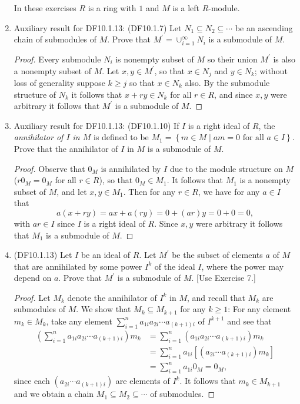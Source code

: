 \documentclass[11pt]{article}
\newcommand{\br}[1]{\left(#1\right)}
\newcommand{\cbr}[1]{\left\{#1\right\}}
\begin{document}
\begin{enumerate}
    In these exercises $R$ is a ring with $1$ and $M$ is a left $R$-module.
    \item Auxiliary result for DF10.1.13: (DF10.1.7) Let $N_1\subseteq N_2\subseteq \cdots$ be an ascending chain of submodules of $M$. Prove that $M^{\prime} = \cup_{i=1}^\infty N_i$ is a submodule of $M$. \begin{proof}
      Every submodule $N_i$ is nonempty subset of $M$ so their union $M^{\prime}$ is also a nonempty subset of $M$. Let $x,y\in M^{\prime}$, so that $x\in N_j$ and $y\in N_k$; without loss of generality suppose $k\geq j$ so that $x\in N_k$ also. By the submodule structure of $N_k$ it follows that $x+ry\in N_k$ for all $r\in R$, and since $x,y$ were arbitrary it follows that $M^{\prime}$ is a submodule of $M$.
    \end{proof}
    \item Auxiliary result for DF10.1.13: (DF10.1.10) If $I$ is a right ideal of $R$, the \textit{annihilator of $I$ in $M$} is defined to be $M_1 = \cbr{m\in M\mid am = 0 \text{ for all } a\in I}$. Prove that the annihilator of $I$ in $M$ is a submodule of $M$. \begin{proof}
      Observe that $0_M$ is annihilated by $I$ due to the module structure on $M$ ($r0_M = 0_M$ for all $r\in R$), so that $0_M\in M_1$. It follows that $M_1$ is a nonempty subset of $M$, and let $x,y\in M_1$. Then for any $r\in R$, we have for any $a\in I$ that \[a(x+ry) = ax + a(ry) = 0 + (ar)y = 0+ 0 = 0,\] with $ar\in I$ since $I$ is a right ideal of $R$. Since $x,y$ were arbitrary it follows that $M_1$ is a submodule of $M$.
    \end{proof}
    \item (DF10.1.13) Let $I$ be an ideal of $R$. Let $M^{\prime}$ be the subset of elements $a$ of $M$ that are annihilated by some power $I^k$ of the ideal $I$, where the power may depend on $a$. Prove that $M^{\prime}$ is a submodule of $M$. [Use Exercise 7.] \begin{proof}
      Let $M_k$ denote the annihilator of $I^k$ in $M$, and recall that $M_k$ are submodules of $M$. We show that $M_k\subseteq M_{k+1}$ for any $k\geq 1$: For any element $m_k\in M_k$, take any element $\sum_{i=1}^n a_{1i}a_{2i}\cdots a_{(k+1)i}$ of $I^{k+1}$ and see that \begin{align*}
        \br{\sum_{i=1}^n a_{1i}a_{2i}\cdots a_{(k+1)i}}m_k &= \sum_{i=1}^n (a_{1i}a_{2i}\cdots a_{(k+1)i})m_k \\
        &= \sum_{i=1}^n a_{1i}[(a_{2i}\cdots a_{(k+1)i})m_k]\\
        &= \sum_{i=1}^n a_{1i}0_M = 0_M,
      \end{align*} since each $(a_{2i}\cdots a_{(k+1)i})$ are elements of $I^k$. It follows that $m_k\in M_{k+1}$ and we obtain a chain $M_1\subseteq M_2\subseteq \cdots$ of submodules.
      

\end{proof}
\end{enumerate}
\end{document}
